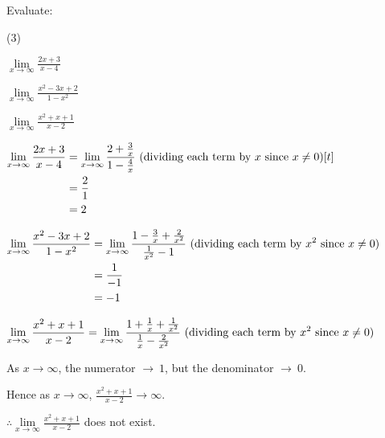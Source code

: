 \documentclass[11pt,a4paper]{book}
\begin{document}
\begin{example}

Evaluate:

\begin{tasks}[label=(\alph*),label-width=3.5ex] (3)

\task  ${\displaystyle \mathop{\lim}\limits _{x\to\infty}\frac{2x+3}{x-4}}$

\task  ${\displaystyle \mathop{\lim}\limits _{x\to\infty}\frac{x^{2}-3x+2}{1-x^{2}}}$

\task  ${\displaystyle \mathop{\lim}\limits _{x\to\infty}\frac{x^{2}+x+1}{x-2}}$

\end{tasks}

\Solution

\begin{tasks}[label=(\alph*),label-width=3.5ex]

\task
$
\begin{aligned}[t]
\mathop{\lim}\limits _{x\to\infty}\frac{2x+3}{x-4} & ={\displaystyle \mathop{\lim}\limits _{x\to\infty}\frac{2+\frac{3}{x}}{1-\frac{4}{x}}\text{ (dividing each term by \ensuremath{x} since \ensuremath{x\neq0})}}\\
 & =\frac{2}{1}\\
 & =2
\end{aligned}[t]
$

\task
$
\begin{aligned}[t]
\mathop{\lim}\limits _{x\to\infty}\frac{x^{2}-3x+2}{1-x^{2}} & =\mathop{\lim}\limits _{x\to\infty}\frac{1-\frac{3}{x}+\frac{2}{x^{2}}}{\frac{1}{x^{2}}-1}\text{ (dividing each term by \ensuremath{x^{2}} since \ensuremath{x\neq0})}\\
 & =\frac{1}{-1}\\
 & =-1
\end{aligned}
$

\task
$
\begin{aligned}[t]
\mathop{\lim}\limits _{x\to\infty}\frac{x^{2}+x+1}{x-2}=\mathop{\lim}\limits _{x\to\infty}\frac{1+\frac{1}{x}+\frac{1}{x^{2}}}{\frac{1}{x}-\frac{2}{x^{2}}}\text{ (dividing each term by \ensuremath{x^{2}} since \ensuremath{x\neq0})}
\end{aligned}
$

As $x\to\infty$, the numerator $\to\:1$, but the denominator $\to\:0$.

Hence as $x\to\infty$, ${\displaystyle \frac{x^{2}+x+1}{x-2}\to\infty}$.

${\displaystyle \therefore\mathop{\lim}\limits _{x\to\infty}\frac{x^{2}+x+1}{x-2}}$
does not exist.

\end{tasks}

\end{example}
\end{document}
